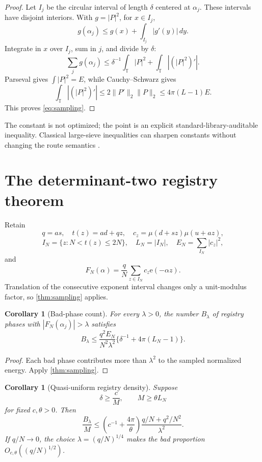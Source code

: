 \documentclass[11pt]{article}
\newtheorem{corollary}[theorem]{Corollary}
\theoremstyle{definition}
\newcommand{\e}{\mathrm e}
\newcommand{\T}{\mathbb T}
\newcommand{\norm}[1]{\lVert#1\rVert}
\begin{document}
\begin{proof}
Let \(I_j\) be the circular interval of length \(\delta\) centered at
\(\alpha_j\).  These intervals have disjoint interiors.  With
\(g=|P|^2\), for \(x\in I_j\),
\[
 g(\alpha_j)\le g(x)+\int_{I_j}|g'(y)|\,dy.
\]
Integrate in \(x\) over \(I_j\), sum in \(j\), and divide by
\(\delta\):
\[
 \sum_jg(\alpha_j)
 \le\delta^{-1}\int_{\T}|P|^2
 +\int_{\T}|(|P|^2)'|.
\]
Parseval gives \(\int|P|^2=E\), while Cauchy--Schwarz gives
\[
 \int_{\T}|(|P|^2)'|
 \le2\norm{P'}_2\norm P_2
 \le4\pi(L-1)E.
\]
This proves \eqref{eq:sampling}.
\end{proof}

The constant is not optimized; the point is an explicit
standard-library-auditable inequality.  Classical large-sieve
inequalities can sharpen constants without changing the route
semantics \citep{MontgomeryVaughan2007}.

\section{The determinant-two registry theorem}

Retain
\[
 q=as,\quad t(z)=ad+qz,\quad
 c_z=\mu(d+sz)\mu(u+az),
\]
\[
 I_N=\{z:N<t(z)\le2N\},\quad
 L_N=|I_N|,\quad E_N=\sum_{I_N}|c_z|^2,
\]
and
\[
 F_N(\alpha)=\frac qN\sum_{z\in I_N}c_z\e(-\alpha z).
\]
Translation of the consecutive exponent interval changes only a
unit-modulus factor, so \cref{thm:sampling} applies.

\begin{corollary}[Bad-phase count]\label{cor:count}
For every \(\lambda>0\), the number \(B_\lambda\) of registry phases
with \(|F_N(\alpha_j)|>\lambda\) satisfies
\begin{equation}
 B_\lambda
 \le
 \frac{q^2E_N}{N^2\lambda^2}
 \{\delta^{-1}+4\pi(L_N-1)\}.
\label{eq:count}
\end{equation}
\end{corollary}

\begin{proof}
Each bad phase contributes more than \(\lambda^2\) to the sampled
normalized energy.  Apply \cref{thm:sampling}.
\end{proof}

\begin{corollary}[Quasi-uniform registry density]\label{cor:density}
Suppose
\[
 \delta\ge\frac cM,\qquad M\ge\theta L_N
\]
for fixed \(c,\theta>0\).  Then
\begin{equation}
 \frac{B_\lambda}{M}
 \le
 \left(c^{-1}+\frac{4\pi}{\theta}\right)
 \frac{q/N+q^2/N^2}{\lambda^2}.
\label{eq:density}
\end{equation}
If \(q/N\to0\), the choice
\(\lambda=(q/N)^{1/4}\) makes the bad proportion
\(O_{c,\theta}((q/N)^{1/2})\).
\end{corollary}
\end{document}
